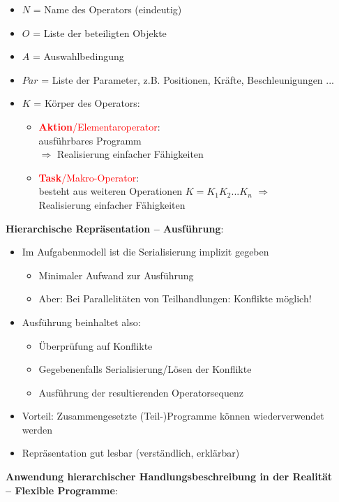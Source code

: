 \begin{itemize}
\item $N$ = Name des Operators (eindeutig)
\item $O$ = Liste der beteiligten Objekte
\item $A$ = Auswahlbedingung
\item $Par$ = Liste der Parameter, z.B. Positionen, Kräfte, Beschleunigungen ...
\item $K$ = Körper des Operators:
\begin{itemize}
\item \textcolor{red}{\textbf{Aktion}/Elementaroperator}:\\ ausführbares Programm\\ $\Rightarrow$ Realisierung einfacher Fähigkeiten
\item \textcolor{red}{\textbf{Task}/Makro-Operator}:\\ besteht aus weiteren Operationen $K = K_1K_2...K_n$ $\Rightarrow$\\ Realisierung einfacher Fähigkeiten
\end{itemize}
\end{itemize}
\textbf{Hierarchische Repräsentation -- Ausführung}:
\begin{itemize}
\item Im Aufgabenmodell ist die Serialisierung implizit gegeben
\begin{itemize}
\item Minimaler Aufwand zur Ausführung
\item Aber: Bei Parallelitäten von Teilhandlungen: Konflikte möglich!
\end{itemize}
\item Ausführung beinhaltet also:
\begin{itemize}
\item Überprüfung auf Konflikte
\item Gegebenenfalls Serialisierung/Lösen der Konflikte
\item Ausführung der resultierenden Operatorsequenz
\end{itemize}
\item Vorteil: Zusammengesetzte (Teil-)Programme können wiederverwendet werden
\item Repräsentation gut \glqq lesbar\grqq{} (verständlich, erklärbar)
\end{itemize}
\textbf{Anwendung hierarchischer Handlungsbeschreibung in der Realität  \\-- Flexible Programme}:\\
